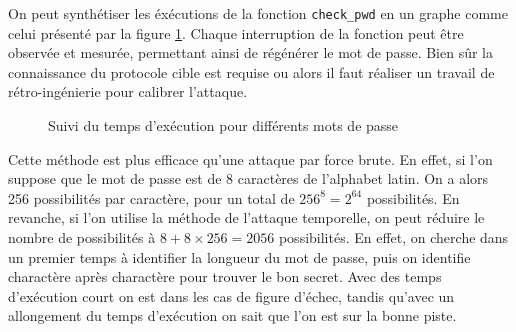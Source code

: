 On peut synthétiser les éxécutions de la fonction \texttt{check\_pwd} en un graphe comme celui présenté par la figure \ref{fig:timing_attack_example}. Chaque interruption de la fonction peut être observée et mesurée, permettant ainsi de régénérer le mot de passe. Bien sûr la connaissance du protocole cible est requise ou alors il faut réaliser un travail de rétro-ingénierie pour calibrer l'attaque.\medbreak

\begin{figure}[!ht]
    \caption{Suivi du temps d'exécution pour différents mots de passe}
    \label{fig:timing_attack_example}
    \center
\end{figure}

Cette méthode est plus efficace qu'une attaque par force brute. En effet, si l'on suppose que le mot de passe est de 8 caractères de l'alphabet latin. On a alors  256 possibilités par caractère, pour un total de $256^8 = 2^{64}$ possibilités. En revanche, si l'on utilise la méthode de l'attaque temporelle, on peut réduire le nombre de possibilités à $8 + 8 \times 256 = 2056$ possibilités. En effet, on cherche dans un premier temps à identifier la longueur du mot de passe, puis on identifie charactère après charactère pour trouver le bon secret. Avec des temps d'exécution court on est dans les cas de figure d'échec, tandis qu'avec un allongement du temps d'exécution on sait que l'on est sur la bonne piste.\medbreak

